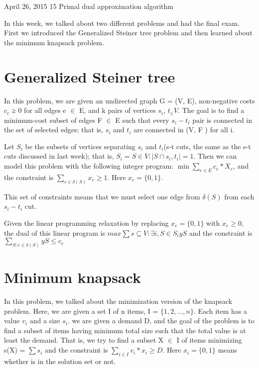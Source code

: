 \documentclass[usletter]{article}
\begin{document}
           {April 26, 2015}                          %
           {15}                                       %
           {Primal dual approximation algorithm}  %

\noindent
In this week, we talked about two different problems and had the final exam. First we introduced the Generalized Steiner tree problem and then learned about the minimum knapsack problem.

\section{Generalized Steiner tree}
In this problem, we are given an undirected graph G = (V, E), non-negative costs $c_e$ ≥ 0 for all edges e $\in$ E, and k pairs of vertices $s_i$, $t_ \in V$. The goal is to find a minimum-cost subset of edges F $\in$ E such that every $s_i-t_i$ pair is connected in the set of selected edges; that is, $s_i$ and $t_i$ are connected in (V, F ) for all i.

Let $S_i$ be the subsets of vertices separating $s_i$ and $t_i$(s-t cuts, the same as the s-t cuts discussed in last week); that is, $S_i = {S \in V : |S \cap {s_i,t_i}| = 1}$. Then we can model this problem with the following integer program: $\min{\sum_{e \in E}{c_e * X_e}}$, and the constraint is $\sum_{e \in \delta(S)}{x_e} \ge 1$. Here $x_e = \{0 ,1\}$. 

This set of constraints means that we must select one edge from $\delta(S)$ from each $s_i-t_i$ cut.

Given the linear programming relaxation by replacing $x_e = \{0 ,1\} $ with $x_e \ge 0$, the dual of this linear program is $max{\sum{s \subseteq V:\exists{i}, S \in S_i}{yS}}$ and the constraint is $\sum_{S: e \in \delta(S)}{yS \le c_e}$

\section{Minimum knapsack}
In this problem,  we talked about the minimization version of the knapsack problem.  Here, we are given a set I of n items,
I = $\{1, 2, . . . , n\}$. Each item has a value $v_i$ and a size $s_i$. we are given a demand D, and the goal of the problem is to find a subset of items having minimum total size such that the total value is at least the demand. That is, we try to find a subset X $\in$ I of items minimizing s(X) = $\sum{s_i}$  and the constraint is $\sum_{i \in I}{v_i*x_i} \ge D$. Here $x_i = \{0,1\}$ means whether is in the solution set or not.
\end{document}
